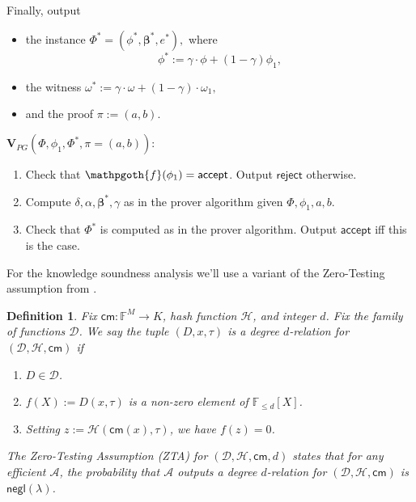 \documentclass[11pt]{article} %
\newcommand{\F}{\ensuremath{\mathbb F}\xspace}
\newcommand{\adv}{\ensuremath{\mathcal A}\xspace}
\newcommand{\cm}{\ensuremath{\mathsf{cm}}\xspace}
\newcommand{\negl}{\ensuremath{\mathsf{negl}(\lambda)}\xspace}
\newcommand{\rej}{\ensuremath{\mathsf{reject}}\xspace}
\newcommand{\acc}{\ensuremath{\mathsf{accept}}\xspace}
\newcommand{\defeq}{:=}
\newcommand{\hash}{\ensuremath{\mathcal{H}}\xspace}
\newcommand{\prf}{\ensuremath{\mathsf{\pi}}\xspace}
\newcommand{\inst}{\ensuremath{\phi}\xspace}
\newcommand{\wit}{\ensuremath{\mathsf{\omega}}\xspace}
\newcommand{\ver}{\ensuremath{\mathsf{\mathbf{V}}}\xspace}
\newcommand{\verpg}{\ensuremath{\ver_{PG}}\xspace}
\newcommand{\polysofdegeq}[1]{\ensuremath{\F_{\leq #1}[X]}\xspace}
\newtheorem{dfn}[lemma]{Definition}
\newcommand{\betaa}{\ensuremath{\mathbf{\boldsymbol{\beta}}}\xspace}
\newcommand{\instt}{\ensuremath{\Phi^*}\xspace}
\newcommand{\insttbase}{\ensuremath{\Phi}\xspace}
\newcommand{\inststar}{\ensuremath{\inst^*}\xspace}
\newcommand{\witstar}{\ensuremath{\wit^*}\xspace}
\newcommand{\predinst}{\ensuremath{\mathpgoth{f}}\xspace}
\newcommand{\ztafuncs}{\ensuremath{\mathcal{D}}\xspace}
\begin{document}
Finally, output
\begin{itemize}
\item the instance
$\instt=(\inststar,\betaa^*,e^*),$
where \[\inst^*\defeq \gamma\cdot \inst + (1-\gamma) \inst_1,\]


\item the witness 
$\witstar\defeq \gamma\cdot \wit + (1-\gamma)\cdot \wit_1,$
\item and the proof $\prf\defeq (a,b)$.\\
\end{itemize}
\noindent
\underline{$\verpg(\insttbase,\inst_1, \instt,\pi=(a,b)):$}\noindent
\begin{enumerate}
\item Check that $\predinst(\inst_1)=\acc$. Output \rej otherwise.
 \item Compute $\delta,\alpha,\betaa^*, \gamma$ as in the prover algorithm given $\insttbase,\inst_1,a,b$.

\item Check that $\instt$ is computed as in the prover algorithm. Output \acc iff this is the case. 
\end{enumerate}



For the knowledge soundness analysis we'll use a variant of the Zero-Testing assumption from \cite{novarecursive}.

\begin{dfn}\label{dfn:ZTA}
Fix $\cm:\F^M\to K$, hash function \hash, and integer $d$. Fix the family of functions \ztafuncs. 
We say the tuple $(D,x,\tau)$ is a \emph{degree $d$-relation for $(\ztafuncs,\hash,\cm)$} if
\begin{enumerate}
 \item $D\in \ztafuncs$.
 \item $f(X)\defeq D(x,\tau)$ is a non-zero element of \polysofdegeq{d}.
 \item Setting $z\defeq \hash(\cm(x),\tau)$, we have $f(z)=0$.
\end{enumerate}

The Zero-Testing Assumption (ZTA) for $(\ztafuncs,\hash,\cm,d)$ states that for any efficient \adv, the probability that 
\adv outputs a degree $d$-relation for $(\ztafuncs,\hash,\cm)$ is \negl.
\end{dfn}
\end{document}
